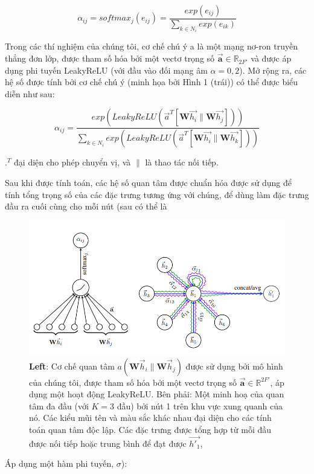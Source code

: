 \[\alpha_{ij} = softmax_j{(e_{ij})} = \frac{ exp(e_{ij} ) }{{\displaystyle \sum}_{k \in N_i}exp(e_{ik})}\]

Trong các thí nghiệm của chúng tôi, cơ chế chú ý a là một mạng nơ-ron truyền thẳng đơn lớp, được tham số hóa bởi một vectơ trọng số 
\(\vec{\textbf{a}} \in \mathbb{R}_{2F'}\) 
và được áp dụng phi tuyến LeakyReLU (với đầu vào đối mạng âm $ \alpha = 0,2$). Mở rộng ra, các hệ số được tính bởi cơ chế chú ý (minh họa bởi Hình 1 (trái)) có thể được biểu diễn như sau:

\[
\alpha_{ij} = \frac
{exp(LeakyReLU(\vec{a}^T[\textbf{W}\vec{h_i}\|\textbf{W}\vec{h_j}]))}
{{\displaystyle \sum}_{k \in N_i} exp(LeakyReLU(\vec{a}^T[\textbf{W}\vec{h_i}\|\textbf{W}\vec{h_k}]))}
\]

$.^T$ đại diện cho phép chuyển vị, và $\|$ là thao tác nối tiếp. 

Sau khi được tính toán, các hệ số quan tâm được chuẩn hóa được sử dụng để tính tổng trọng số của các đặc trưng tương ứng với chúng, để dùng làm đặc trưng đầu ra cuối cùng cho mỗi nút (sau có thể là

\begin{figure} [!hp]
	\includegraphics[scale = 1]{Chapter1/Figs/Figure1.png}
	\caption{\textbf{Left}: Cơ chế quan tâm 
			\(a(\textbf{W}\vec{h}_i\|\textbf{W}\vec{h}_j)\)
			được sử dụng bởi mô hình của chúng tôi, được tham số hóa bởi một vectơ trọng số 
			\(\vec{\textbf{a}} \in \mathbb{R}^{2F'}\),
		   áp dụng một hoạt động LeakyReLU. Bên phải: Một minh hoạ của quan tâm đa đầu (với $K = 3$ đầu) bởi nút 1 trên khu vực xung quanh của nó. Các kiểu mũi tên và màu sắc khác nhau đại diện cho các tính toán quan tâm độc lập. Các đặc trưng được tổng hợp từ mỗi đầu được nối tiếp hoặc trung bình để đạt được $\vec{h'_1}$,}
	\label{fig:figure1}
\end{figure}
Áp dụng một hàm phi tuyến, $\sigma$):

